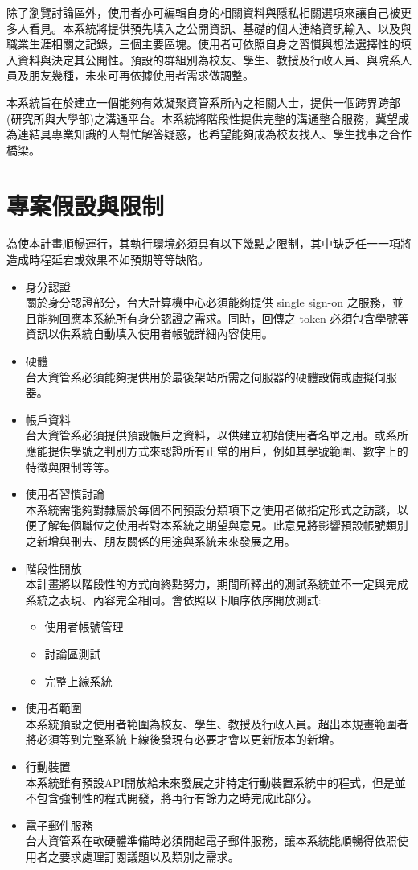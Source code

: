 \documentclass[11pt]{article}
\begin{document}
除了瀏覽討論區外，使用者亦可編輯自身的相關資料與隱私相關選項來讓自己被更多人看見。本系統將提供預先填入之公開資訊、基礎的個人連絡資訊輸入、以及與職業生涯相關之記錄，三個主要區塊。使用者可依照自身之習慣與想法選擇性的填入資料與決定其公開性。預設的群組別為校友、學生、教授及行政人員、與院系人員及朋友幾種，未來可再依據使用者需求做調整。

本系統旨在於建立一個能夠有效凝聚資管系所內之相關人士，提供一個跨界跨部(研究所與大學部)之溝通平台。本系統將階段性提供完整的溝通整合服務，冀望成為連結具專業知識的人幫忙解答疑惑，也希望能夠成為校友找人、學生找事之合作橋梁。

\section{專案假設與限制}

為使本計畫順暢運行，其執行環境必須具有以下幾點之限制，其中缺乏任一一項將造成時程延宕或效果不如預期等等缺陷。

\begin{itemize}
\item{身分認證\\
關於身分認證部分，台大計算機中心必須能夠提供 single sign-on 之服務，並且能夠回應本系統所有身分認證之需求。同時，回傳之 token 必須包含學號等資訊以供系統自動填入使用者帳號詳細內容使用。}
\item{硬體\\
台大資管系必須能夠提供用於最後架站所需之伺服器的硬體設備或虛擬伺服器。}
\item{帳戶資料\\
台大資管系必須提供預設帳戶之資料，以供建立初始使用者名單之用。或系所應能提供學號之判別方式來認證所有正常的用戶，例如其學號範圍、數字上的特徵與限制等等。}
\item{使用者習慣討論\\
本系統需能夠對隸屬於每個不同預設分類項下之使用者做指定形式之訪談，以便了解每個職位之使用者對本系統之期望與意見。此意見將影響預設帳號類別之新增與刪去、朋友關係的用途與系統未來發展之用。}
\item{階段性開放\\
本計畫將以階段性的方式向終點努力，期間所釋出的測試系統並不一定與完成系統之表現、內容完全相同。會依照以下順序依序開放測試:
\begin{itemize}
\item{使用者帳號管理}
\item{討論區測試}
\item{完整上線系統}
\end{itemize}}
\item{使用者範圍\\
本系統預設之使用者範圍為校友、學生、教授及行政人員。超出本規畫範圍者將必須等到完整系統上線後發現有必要才會以更新版本的新增。}
\item{行動裝置\\
本系統雖有預設API開放給未來發展之非特定行動裝置系統中的程式，但是並不包含強制性的程式開發，將再行有餘力之時完成此部分。}
\item{電子郵件服務\\
台大資管系在軟硬體準備時必須開起電子郵件服務，讓本系統能順暢得依照使用者之要求處理訂閱議題以及類別之需求。}
\end{itemize}
\end{document}

